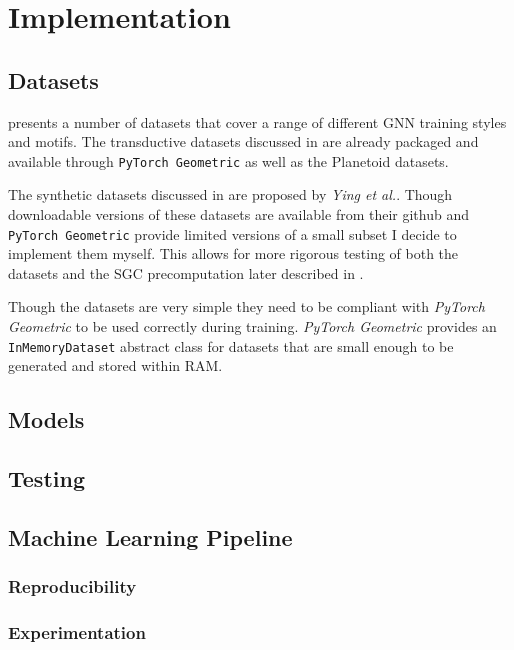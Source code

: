 \chapter{Implementation}

\section{Datasets}
\label{sec:datasets-imp}
 presents a number of datasets that cover a range of different GNN training styles and motifs.
The transductive datasets discussed in  are already packaged and available through \texttt{PyTorch Geometric}\cite{Fey/Lenssen/2019} as well as the Planetoid\cite{planetoid}\cite{citation} datasets.

The synthetic datasets discussed in  are proposed by \textit{Ying et al.}\cite{ying2019gnnexplainer}.
Though downloadable versions of these datasets are available from their github and \texttt{PyTorch Geometric} provide limited versions of a small subset I decide to implement them myself.
This allows for more rigorous testing of both the datasets and the SGC precomputation later described in .

Though the datasets are very simple they need to be compliant with \textit{PyTorch Geometric} to be used correctly during training.
\textit{PyTorch Geometric} provides an \texttt{InMemoryDataset} abstract class for datasets that are small enough to be generated and stored within RAM.


\section{Models}

\section{Testing}
\label{sec:testing-imp}

\section{Machine Learning Pipeline}

\subsection{Reproducibility}

\subsection{Experimentation}

